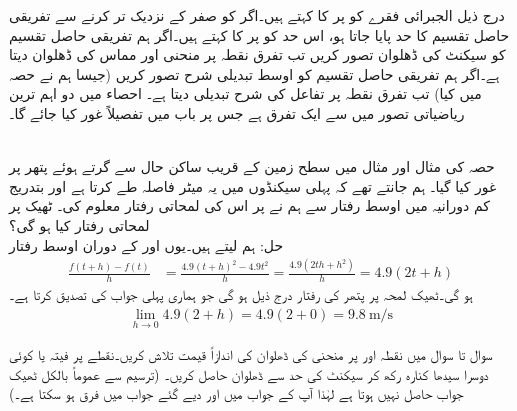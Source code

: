 درج ذیل الجبرائی فقرے کو  پر  کا   کہتے ہیں۔اگر  کو صفر کے نزدیک تر کرنے سے تفریقی حاصل تقسیم کا حد پایا جاتا ہو، اس حد کو  پر  کا  کہتے ہیں۔اگر ہم تفریقی حاصل تقسیم کو سیکنٹ کی ڈھلوان تصور کریں تب تفرق نقطہ  پر منحنی اور مماس کی ڈھلوان دیتا ہے۔اگر ہم تفریقی حاصل تقسیم کو اوسط تبدیلی شرح تصور کریں (جیسا ہم نے حصہ  میں کیا) تب تفرق نقطہ  پر تفاعل کی شرح تبدیلی دیتا ہے۔  احصاء میں دو اہم ترین ریاضیاتی تصور میں سے ایک تفرق ہے جس پر باب  میں تفصیلاً غور کیا جائے گا۔

\\
حصہ  کی مثال  اور مثال  میں سطح زمین کے قریب  ساکن حال سے  گرتے ہوئے پتھر پر غور کیا گیا۔ ہم جانتے تھے کہ پہلی  سیکنڈوں میں یہ  میٹر فاصلہ طے کرتا ہے اور بتدریج کم دورانیہ میں اوسط رفتار سے  ہم نے  پر اس کی لمحاتی رفتار معلوم کی۔ ٹھیک  پر لمحاتی رفتار کیا ہو گی؟\\
حل:\quad
ہم  لیتے ہیں۔یوں  اور  کے دوران اوسط رفتار
\begin{align*}
\frac{f(t+h)-f(t)}{h}&=\frac{4.9(t+h)^2-4.9t^2}{h}=\frac{4.9(2th+h^2)}{h}=4.9(2t+h)
\end{align*}
ہو گی۔ٹھیک لمحہ  پر پتھر کی رفتار درج ذیل ہو گی جو ہماری پہلی جواب کی تصدیق کرتا ہے۔
\begin{align*}
\lim_{h\to 0} 4.9(2+h)=4.9(2+0)=\SI{9.8}{\meter\per\second}
\end{align*}

سوال  تا سوال  میں نقطہ  اور  پر منحنی کی ڈھلوان کی اندازاً قیمت تلاش کریں۔نقطے پر فیتہ یا کوئی دوسرا سیدھا کنارہ رکھ کر سیکنٹ کی حد سے ڈھلوان حاصل کریں۔ (ترسیم سے عموماً بالکل ٹھیک جواب حاصل نہیں ہوتا ہے لہٰذا آپ کے جواب میں اور دیے گئے جواب میں فرق ہو سکتا ہے۔)  

